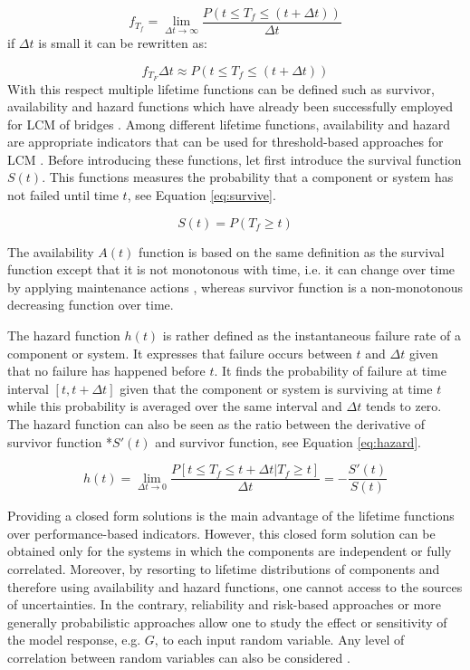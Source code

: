 \begin{equation}
 f_{T_f}  = \lim_{\Delta t\to\infty} \frac{P(t\leq T_f \leq (t+\Delta t))}{\Delta t} 
 \label{eq:pdfttofail}
\end{equation}
if $\Delta t$ is small it can be rewritten as: 

\begin{equation}
 f_{T_F} \Delta t \approx P(t\leq T_f \leq (t+\Delta t))
 \label{eq:ttofail}
\end{equation}
\noindent
With this respect multiple lifetime functions can be defined such as survivor, availability and hazard functions which have already been successfully employed for LCM of bridges 
\citep{orcesi2011, okasha2009, YANG200439}. Among different lifetime functions, availability and hazard are appropriate indicators that can be used for threshold-based approaches for
LCM \citep{BARONE201421}. Before introducing these functions, let first introduce the survival function $S(t)$. This functions measures the probability that a component or system 
has not failed until time $t$, see Equation \ref{eq:survive}. 

\begin{equation}
 S(t) = P(T_f \geq t)
 \label{eq:survive}
\end{equation}

The availability $A(t)$ function is based on the same definition as the survival function except that it is not monotonous with time, i.e. it can change over time by applying maintenance actions 
, whereas survivor function is a non-monotonous decreasing function over time.

The hazard function $h(t)$ is rather defined as the instantaneous failure rate of a component or system. It expresses that failure occurs between $t$ and $\Delta t$ given that no failure has
happened before $t$. It finds the probability of failure at time interval $[t, t+\Delta t]$ given that the component or system is surviving 
at time $t$ while this probability is averaged over the same interval and $\Delta t$ tends to zero. The hazard function can also be seen as the ratio between the derivative of survivor function 
*$S'(t)$ and survivor function, see Equation \ref{eq:hazard}.

\begin{equation}
 h(t) = \lim_{\Delta t\to 0} \frac{P[t \leq T_f \leq t+\Delta t | T_f \geq t]}{\Delta t} = - \frac{S'(t)}{S(t)}
 \label{eq:hazard}
\end{equation}

Providing a closed form solutions is the main advantage of the lifetime functions over performance-based indicators. However, this closed form solution can be obtained
only for the systems in which the components are independent or fully correlated. Moreover, by resorting to lifetime distributions of components and therefore using availability and hazard functions, 
one cannot access to the sources of uncertainties. In the contrary, reliability and risk-based approaches or more generally probabilistic approaches allow one to study the effect or sensitivity of the 
model response, e.g. $G$, to each input random variable. Any level of correlation between random variables can also be considered \citep{BARONE201421}.  
 


